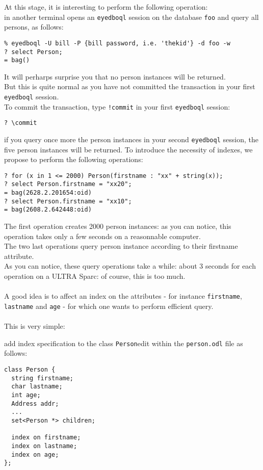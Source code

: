 At this stage, it is interesting to perform the following operation:\\
in another terminal opens an \texttt{eyedboql} session on the database \texttt{foo}
and query all persons, as follows:
\verbsize \begin{verbatim}
% eyedboql -U bill -P {bill password, i.e. 'thekid'} -d foo -w
? select Person;
= bag()
\end{verbatim}
\normalsize
It will perharps surprise you that no person instances will be returned.
\\
But this is quite normal as you have not committed the transaction
in your first \texttt{eyedboql} session.
\\
To commit the transaction, type \texttt{!commit} in your first \texttt{eyedboql}
session:
\verbsize \begin{verbatim}
? \commit
\end{verbatim}
\normalsize
if you query once more the person instances in your second \texttt{eyedboql}
session, the five person instances will be returned.
To introduce the necessity of indexes, we propose to perform the following
operations:
\verbsize \begin{verbatim}
? for (x in 1 <= 2000) Person(firstname : "xx" + string(x));
? select Person.firstname = "xx20";
= bag(2628.2.201654:oid)
? select Person.firstname = "xx10";
= bag(2608.2.642448:oid)
\end{verbatim}
\normalsize
The first operation creates 2000 person instances: as you can notice,
this operation takes only a few seconds on a reasonnable computer.
\\
The two last operations query person instance according to their firstname
attribute.
\\
As you can notice, these query operations take a while: about 3 seconds
for each operation on a ULTRA Sparc: of course, this is too much.
\\
\\
A good idea is to affect an index on the attributes - for instance
\texttt{firstname}, \texttt{lastname} and \texttt{age} - for which one wants
to perform efficient query.
\\
\\
This is very simple:
\be
\item add index specification to the class \texttt{Person}edit within
the \texttt{person.odl} file as follows:
\verbsize \begin{verbatim}
class Person {
  string firstname;
  char lastname;
  int age;
  Address addr;
  ...
  set<Person *> children;

  index on firstname;
  index on lastname;
  index on age;
};
\end{verbatim}
